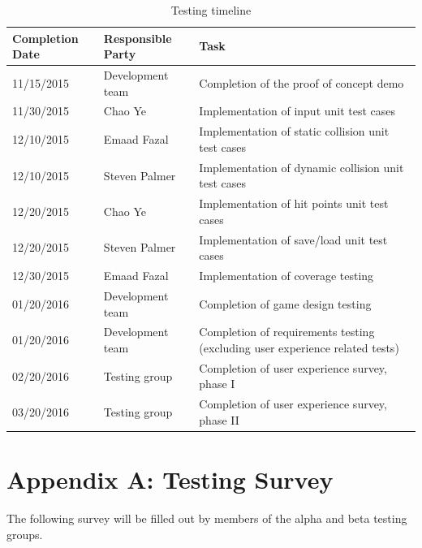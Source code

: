 \documentclass[12pt, titlepage]{article}
\begin{document}
\begin{table}[ht]
\caption{Testing timeline} \label{tab:timeline}
\begin{tabularx}{\textwidth}{p{2.5cm}p{3cm}X}
\toprule {\bf Completion Date} & {\bf Responsible Party} & {\bf Task}\\
\midrule
11/15/2015 & Development team & Completion of the proof of concept demo\\[0.3\baselineskip]
11/30/2015 & Chao Ye & Implementation of input unit test cases\\[0.3\baselineskip]
12/10/2015 & Emaad Fazal & Implementation of static collision unit test cases\\[0.3\baselineskip]
12/10/2015 & Steven Palmer & Implementation of dynamic collision unit test cases\\[0.3\baselineskip]
12/20/2015 & Chao Ye & Implementation of hit points unit test cases\\[0.3\baselineskip]
12/20/2015 & Steven Palmer & Implementation of save/load unit test cases\\[0.3\baselineskip]
12/30/2015 & Emaad Fazal & Implementation of coverage testing\\[0.3\baselineskip]
01/20/2016 & Development team & Completion of game design testing\\[0.3\baselineskip]
01/20/2016 & Development team & Completion of requirements testing (excluding user experience related tests)\\[0.3\baselineskip]
02/20/2016 & Testing group & Completion of user experience survey, phase I \\[0.3\baselineskip]
03/20/2016 & Testing group & Completion of user experience survey, phase II\\
\bottomrule
\end{tabularx}
\end{table}



\newpage
\section{Appendix A:  Testing Survey}
\label{sec:survey}

The following survey will be filled out by members of the alpha and beta testing groups.
\end{document}
